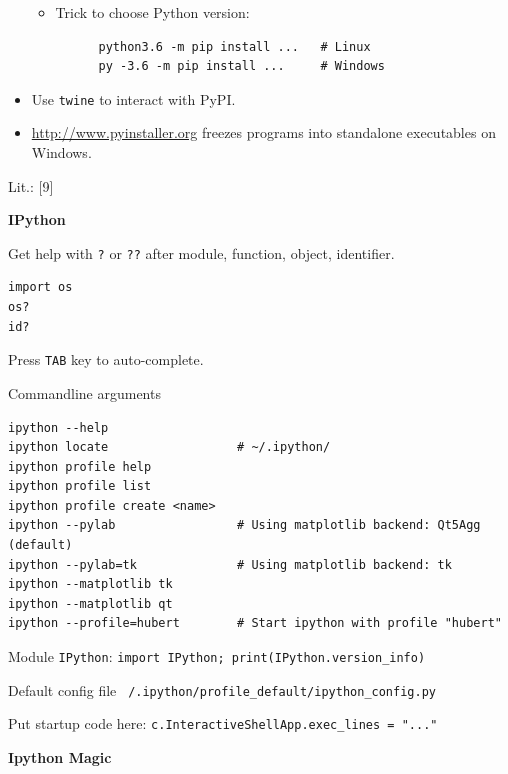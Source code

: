 \documentclass[9pt,a4wide]{extarticle}
\begin{document}
\begin{itemize}
\begin{itemize}
   \item Trick to choose Python version:
   
      \begin{verbatim}
      python3.6 -m pip install ...   # Linux
      py -3.6 -m pip install ...     # Windows
      \end{verbatim}

   \end{itemize}

   \item Use {\tt twine} to interact with PyPI.

   \item \url{http://www.pyinstaller.org} freezes programs into standalone
         executables on Windows.

\end{itemize}

Lit.: [9]

\label{ipython-section}

\medskip
{\bf IPython}
{}

Get help with {\tt ?} or {\tt ??} after module, function, 
object, identifier.

\begin{verbatim}
import os
os?
id?
\end{verbatim}

Press {\tt TAB} key to auto-complete.

Commandline arguments

\begin{verbatim}
ipython --help
ipython locate                  # ~/.ipython/
ipython profile help    
ipython profile list
ipython profile create <name>   
ipython --pylab                 # Using matplotlib backend: Qt5Agg (default)
ipython --pylab=tk              # Using matplotlib backend: tk
ipython --matplotlib tk
ipython --matplotlib qt
ipython --profile=hubert        # Start ipython with profile "hubert"
\end{verbatim}

Module {\tt IPython}: {\tt import IPython; print(IPython.version\_info)}

Default config file {\tt ~/.ipython/profile\_default/ipython\_config.py}

Put startup code here: {\tt c.InteractiveShellApp.exec\_lines = "..."}


\medskip
{\bf Ipython Magic}
\end{document}
